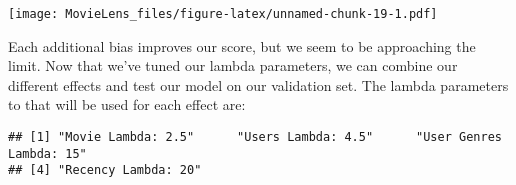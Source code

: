 \documentclass[
]{article}
\newenvironment{Shaded}{\begin{snugshade}}{\end{snugshade}}
\newcommand{\DataTypeTok}[1]{\textcolor[rgb]{0.13,0.29,0.53}{#1}}
\newcommand{\DecValTok}[1]{\textcolor[rgb]{0.00,0.00,0.81}{#1}}
\newcommand{\KeywordTok}[1]{\textcolor[rgb]{0.13,0.29,0.53}{\textbf{#1}}}
\newcommand{\NormalTok}[1]{#1}
\newcommand{\OperatorTok}[1]{\textcolor[rgb]{0.81,0.36,0.00}{\textbf{#1}}}
\newcommand{\StringTok}[1]{\textcolor[rgb]{0.31,0.60,0.02}{#1}}
\begin{document}
\begin{Shaded}
\end{Shaded}

\texttt{[image: MovieLens\_files/figure-latex/unnamed-chunk-19-1.pdf]}

Each additional bias improves our score, but we seem to be approaching
the limit. Now that we've tuned our lambda parameters, we can combine
our different effects and test our model on our validation set. The
lambda parameters to that will be used for each effect are:

\begin{verbatim}
## [1] "Movie Lambda: 2.5"      "Users Lambda: 4.5"      "User Genres Lambda: 15"
## [4] "Recency Lambda: 20"
\end{verbatim}
\end{document}
